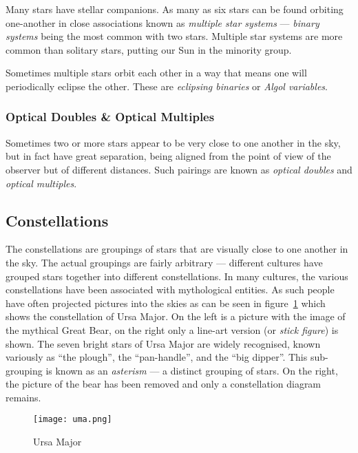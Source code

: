 Many stars have stellar companions. As many as six stars can be found
orbiting one-another in close associations known as
\emph{multiple star systems} --- \emph{binary systems} being the most
common with two stars. Multiple star systems are more common than
solitary stars, putting our Sun in the minority group.

Sometimes multiple stars orbit each other in a way that means one will
periodically eclipse the other. These are \emph{eclipsing binaries} or
\emph{Algol variables}.

\subsubsection{Optical Doubles \& Optical Multiples}
\label{sec:Phenomena:multipleStars:optical}

Sometimes two or more stars appear to be very close to one another in
the sky, but in fact have great separation, being aligned from the point
of view of the observer but of different distances. Such pairings are
known as \emph{optical doubles} and \emph{optical multiples}.

\subsection{Constellations}
\label{sec:Phenomena:Constellations}

The constellations are groupings of stars that are visually close to one
another in the sky. The actual groupings are fairly arbitrary ---
different cultures have grouped stars together into different
constellations. In many cultures, the various constellations have been
associated with mythological entities. As such people have often
projected pictures into the skies as can be seen in figure~\ref{fig:ursamajor} which shows the constellation of Ursa Major. On the
left is a picture with the image of the mythical Great Bear, on the
right only a line-art version (or \emph{stick figure}) is shown. The seven bright stars of Ursa
Major are widely recognised, known variously as ``the plough'', the
``pan-handle'', and the ``big dipper''. This sub-grouping is known as an
\emph{asterism} --- a distinct grouping of stars. On the right, the
picture of the bear has been removed and only a constellation diagram
remains.

\begin{figure}[tbp]
\centering\texttt{[image: uma.png]}
\caption{Ursa Major}
\label{fig:ursamajor}
\end{figure}


